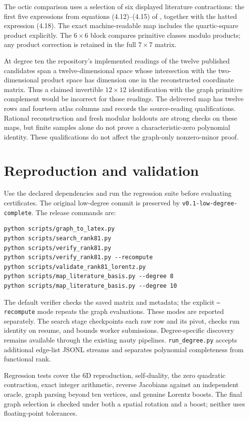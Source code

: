 \documentclass[11pt]{article}
\begin{document}
The octic comparison uses a selection of six displayed literature
contractions: the first five expressions from equations (4.12)--(4.15) of
\cite{cederwall}, together with the hatted expression (4.18). The exact
machine-readable map includes the quartic-square product explicitly.
The $6\times6$ block compares primitive classes modulo products; any product
correction is retained in the full $7\times7$ matrix.

At degree ten the repository's implemented readings of the twelve published
candidates span a twelve-dimensional space whose intersection with the
two-dimensional product space has dimension one in the reconstructed
coordinate matrix. Thus a claimed invertible $12\times12$ identification
with the graph primitive complement would be incorrect for those readings.
The delivered map has twelve rows and fourteen atlas columns and records
the source-reading qualifications. Rational reconstruction and fresh modular
holdouts are strong checks on these maps, but finite samples alone do not
prove a characteristic-zero polynomial identity. These qualifications do not
affect the graph-only nonzero-minor proof.

\section{Reproduction and validation}
Use the declared dependencies and run the regression suite before evaluating
certificates. The original low-degree commit is preserved by
\texttt{v0.1-low-degree-complete}. The release commands are:
\begin{verbatim}
python scripts/graph_to_latex.py
python scripts/search_rank81.py
python scripts/verify_rank81.py
python scripts/verify_rank81.py --recompute
python scripts/validate_rank81_lorentz.py
python scripts/map_literature_basis.py --degree 8
python scripts/map_literature_basis.py --degree 10
\end{verbatim}
The default verifier checks the saved matrix and metadata; the explicit
\texttt{--recompute} mode repeats the graph evaluations. These modes are
reported separately. The search stage checkpoints each raw row and its
pivot, checks run identity on resume, and bounds worker submissions.
Degree-specific discovery remains available through the existing nauty
pipelines. \texttt{run\_degree.py} accepts additional edge-list JSONL streams
and separates polynomial completeness from functional rank.

Regression tests cover the 6D reproduction, self-duality,
the zero quadratic contraction, exact integer arithmetic, reverse
Jacobians against an independent oracle, graph parsing beyond ten vertices,
and genuine Lorentz boosts. The final graph selection is checked under both
a spatial rotation and a boost; neither uses floating-point tolerances.
\end{document}
